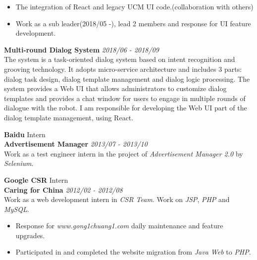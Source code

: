 \documentclass[a4paper]{article}
\newenvironment{changemargin}[2]{%
  \begin{list}{}{%
    \setlength{\topsep}{0pt}%
    \setlength{\leftmargin}{#1}%
    \setlength{\rightmargin}{#2}%
    \setlength{\listparindent}{\parindent}%
    \setlength{\itemindent}{\parindent}%
    \setlength{\parsep}{\parskip}%
  }%
  \item[]}{\end{list}
}
\newenvironment{body} {
	\vspace*{-16pt}
	\begin{changemargin}{-0.25in}{-0.5in}
  }	
	{\end{changemargin}
}
\begin{document}
\begin{body}
\begin{itemize}
	\end{itemize}
	\vspace*{-12pt}
	\begin{itemize} \itemsep -0pt  %
		\item The integration of React and legacy UCM UI code.(collaboration with others)\\
	\end{itemize}
	\vspace*{-12pt}
	\begin{itemize} \itemsep -0pt  %
		\item Work as a sub leader(2018/05 -), lead 2 members and response for UI feature development.\\
	\end{itemize}
	\vspace*{-4pt}
	\textbf{Multi-round Dialog System} \hfill \emph{2018/06 - 2018/09}\\
	The system is a task-oriented dialog system based on intent recognition and grooving technology. It adopts micro-service architecture and includes 3 parts: dialog task design, dialog template management and dialog logic processing. The system provides a Web UI that allows administrators to customize dialog templates and provides a chat window for users to engage in multiple rounds of dialogue with the robot. I am responsible for developing the Web UI part of the dialog template management, using React.\\
	\medskip
	
	\textbf{Baidu} \hfill Intern\\ 
	\textbf{Advertisement Manager} \hfill \emph{2013/07 - 2013/10}\\ 
	Work as a test engineer intern in the project of \emph{Advertisement Manager 2.0} by \emph{Selenium}.\\
	\medskip
	
	\textbf{Google CSR} \hfill Intern\\ 
	\textbf{Caring for China} \hfill \emph{2012/02 - 2012/08}\\ 
	Work as a web development intern in \emph{CSR Team}. Work on \emph{JSP}, \emph{PHP} and \emph{MySQL}.
	\vspace*{-4pt}
	\begin{itemize} \itemsep -0pt  %
		\item Response for \emph{www.gong1chuang1.com} daily maintenance and feature upgrades.\\
	\end{itemize}
	\vspace*{-10pt}
	\begin{itemize} \itemsep -0pt  %
		\item Participated in and completed the website migration from \emph{Java Web} to \emph{PHP}.\\
	\end{itemize}
\end{body}
\end{document}
